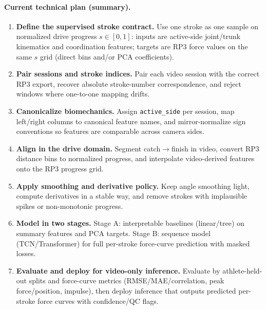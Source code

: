 \documentclass[11pt]{article}
\begin{document}
\paragraph{Current technical plan (summary).}
\begin{enumerate}
	\item \textbf{Define the supervised stroke contract.} Use one stroke as one sample on normalized drive progress $s \in [0,1]$: inputs are active-side joint/trunk kinematics and coordination features; targets are RP3 force values on the same $s$ grid (direct bins and/or PCA coefficients).
	\item \textbf{Pair sessions and stroke indices.} Pair each video session with the correct RP3 export, recover absolute stroke-number correspondence, and reject windows where one-to-one mapping drifts.
	\item \textbf{Canonicalize biomechanics.} Assign \texttt{active\_side} per session, map left/right columns to canonical feature names, and mirror-normalize sign conventions so features are comparable across camera sides.
	\item \textbf{Align in the drive domain.} Segment catch$\rightarrow$finish in video, convert RP3 distance bins to normalized progress, and interpolate video-derived features onto the RP3 progress grid.
	\item \textbf{Apply smoothing and derivative policy.} Keep angle smoothing light, compute derivatives in a stable way, and remove strokes with implausible spikes or non-monotonic progress.
	\item \textbf{Model in two stages.} Stage A: interpretable baselines (linear/tree) on summary features and PCA targets. Stage B: sequence model (TCN/Transformer) for full per-stroke force-curve prediction with masked losses.
	\item \textbf{Evaluate and deploy for video-only inference.} Evaluate by athlete-held-out splits and force-curve metrics (RMSE/MAE/correlation, peak force/position, impulse), then deploy inference that outputs predicted per-stroke force curves with confidence/QC flags.
\end{enumerate}
\end{document}
